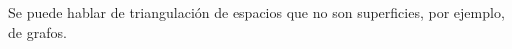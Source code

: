 \documentclass[GTSResumen.tex]{subfiles}
\begin{document}
\begin{comment}
\begin{tikzpicture}[line cap=round,line join=round,>=triangle 45,x=1.0cm,y=1.0cm]
\clip(-1.8733333333333335,-0.5) rectangle (13.46,3.5);
\draw (0.,0.)-- (3.,0.);
\draw (3.,0.)-- (3.,3.);
\draw (3.,3.)-- (0.,3.);
\draw (0.,3.)-- (0.,0.);
\draw (0.,2.)-- (3.,2.);
\draw (0.,1.)-- (3.,1.);
\draw (1.,3.)-- (1.,0.);
\draw (2.,3.)-- (2.,0.);
\draw (1.,3.)-- (0.,2.);
\draw (2.,3.)-- (0.,1.);
\draw (3.,3.)-- (0.,0.);
\draw (3.,2.)-- (1.,0.);
\draw (3.,1.)-- (2.,0.);
\draw [->] (0.,0.) -- (0.,1.54);
\draw [->] (3.,0.) -- (3.,1.46);
\draw [->] (0.,3.) -- (1.5266666666666668,3.);
\draw [->] (0.,0.) -- (1.5666666666666669,0.);
\draw (-0.5,0) node[anchor=north west] {$v_0$};
\draw (-0.6,3.2) node[anchor=north west] {$v_0$};
\draw (2.9,0) node[anchor=north west] {$v_0$};
\draw (3,3.2) node[anchor=north west] {$v_0$};
\draw (0.8,0.0) node[anchor=north west] {$v_1$};
\draw (0.8,3.4) node[anchor=north west] {$v_1$};
\draw (1.8,0.0) node[anchor=north west] {$v_2$};
\draw (1.8,3.4) node[anchor=north west] {$v_2$};
\draw (-0.6,2.2) node[anchor=north west] {$v_3$};
\draw (3,2.2) node[anchor=north west] {$v_3$};
\draw (-0.6,1.2) node[anchor=north west] {$v_4$};
\draw (3.,1.2) node[anchor=north west] {$v_4$};
\draw (1.,2.) node[anchor=north west] {$v_5$};
\draw (2.,2.) node[anchor=north west] {$v_6$};
\draw (1.,1.) node[anchor=north west] {$v_7$};
\draw (2.,1.) node[anchor=north west] {$v_8$};
\draw [fill=black] (0,0) circle (2pt);
\draw [fill=black] (0,1) circle (2pt);
\draw [fill=black] (1,0) circle (2pt);
\draw [fill=black] (1,1) circle (2pt);
\draw [fill=black] (0,2) circle (2pt);
\draw [fill=black] (2,0) circle (2pt);
\draw [fill=black] (2,2) circle (2pt);
\draw [fill=black] (1,2) circle (2pt);
\draw [fill=black] (2,1) circle (2pt);
\draw [fill=black] (0,3) circle (2pt);
\draw [fill=black] (3,0) circle (2pt);
\draw [fill=black] (3,3) circle (2pt);
\draw [fill=black] (1,3) circle (2pt);
\draw [fill=black] (3,1) circle (2pt);
\draw [fill=black] (2,3) circle (2pt);
\draw [fill=black] (3,2) circle (2pt);

\end{tikzpicture}
Observar que la triangulación aquí descrita no es plana pues las caras exteriores son iguales dos a dos. Al identificar tenemos una triangulación en el espacio tridimensional.
\end{enumerate}
\end{ej}
\end{comment}
\begin{nota}
Se puede hablar de triangulación de espacios que no son superficies, por ejemplo, de grafos.
\end{nota}
\end{document}
